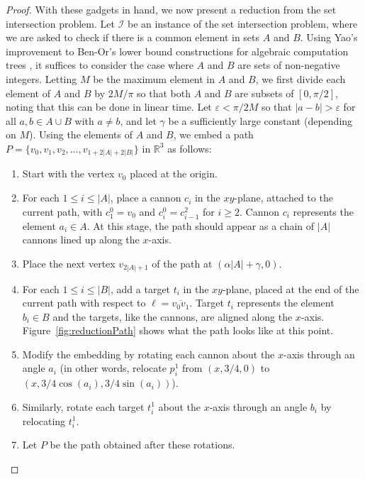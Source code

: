 \documentclass[11pt]{article}
\newcommand{\changedagain}[1]{{#1}}
\begin{document}
\begin{proof}
With these gadgets in hand, we now present a reduction from the set intersection problem.  Let $\mathcal{I}$ be an instance of the set intersection problem, where we are asked to check if there is a common element in sets $A$ and $B$. Using Yao's improvement to Ben-Or's lower bound constructions for algebraic computation trees \cite{Yao91}, it suffices to consider the case where $A$ and $B$ are sets of non-negative integers.  Letting $M$ be the maximum element in $A$ and $B$, we first divide each element of $A$ and $B$ by $2M/\pi$ so that both $A$ and $B$ are subsets of $[0,\pi/2]$, noting that this can be done in linear time.  Let $\varepsilon < \pi/2M$ so that $|a-b|>\varepsilon$ for all $a,b\in A \cup B$ with $a\neq b$, and let $\gamma$ be a sufficiently large constant (depending on $M$).  Using \changedagain{the elements} of $A$ and $B$, we embed a path $P=\{v_0,v_1,v_2,\ldots,v_{1+2|A|+2|B|}\}$ in $\mathbb{R}^3$ as follows:
\begin{enumerate}
\item Start with the vertex $v_0$ placed \changedagain{at} the origin.
\item For each $1 \leq i \leq |A|$, place a cannon $c_i$ in the $xy$-plane, attached to the current path, with $c_1^0 = v_0$ and $c_i^0 = c_{i-1}^2$ for $i \geq 2$.  Cannon $c_i$ \changedagain{represents} the element $a_i\in A$.  At this stage, the path should appear as a chain of $|A|$ cannons lined up along the $x$-axis.
\item Place the next vertex $v_{2|A|+1}$ of the path \changedagain{at} $(\alpha|A|+\gamma,0)$.
\item For each $1\leq i \leq |B|$, add a target $t_i$ in the $xy$-plane, placed at the end of the current path with respect to $\ell = \overline{v_0v_1}$.  Target $t_i$ \changedagain{represents} the element $b_i \in B$ and the targets, like the cannons, \changedagain{are} aligned along the $x$-axis. Figure~\ref{fig:reductionPath} shows what the path looks like at this point.
\item\label{enum:rotate1} Modify the embedding by rotating each cannon about the $x$-axis through an angle $a_i$ (in other words, relocate $p_i^1$ from $(x,3/4,0)$ to $(x,3/4\cos(a_i),3/4\sin(a_i))$).
\item Similarly, rotate each target $t_i^1$ about the $x$-axis through an angle $b_i$ by relocating $t_i^1$.
\item Let $P$ be the path obtained after these rotations.
\end{enumerate}


\end{proof}
\end{document}
